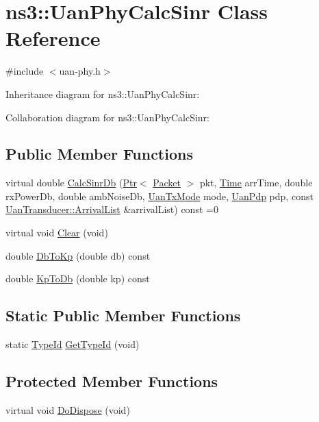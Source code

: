 \hypertarget{classns3_1_1UanPhyCalcSinr}{}\section{ns3\+:\+:Uan\+Phy\+Calc\+Sinr Class Reference}
\label{classns3_1_1UanPhyCalcSinr}


{\ttfamily \#include $<$uan-\/phy.\+h$>$}



Inheritance diagram for ns3\+:\+:Uan\+Phy\+Calc\+Sinr\+:


Collaboration diagram for ns3\+:\+:Uan\+Phy\+Calc\+Sinr\+:
\subsection*{Public Member Functions}
\begin{DoxyCompactItemize}
\item 
virtual double \hyperlink{classns3_1_1UanPhyCalcSinr_ad595f00cc07f863e9f5f957e2f772d56}{Calc\+Sinr\+Db} (\hyperlink{classns3_1_1Ptr}{Ptr}$<$ \hyperlink{classns3_1_1Packet}{Packet} $>$ pkt, \hyperlink{classns3_1_1Time}{Time} arr\+Time, double rx\+Power\+Db, double amb\+Noise\+Db, \hyperlink{classns3_1_1UanTxMode}{Uan\+Tx\+Mode} mode, \hyperlink{classns3_1_1UanPdp}{Uan\+Pdp} pdp, const \hyperlink{classns3_1_1UanTransducer_a95332a21e30506421a116d4b5c4dfd75}{Uan\+Transducer\+::\+Arrival\+List} \&arrival\+List) const =0
\item 
virtual void \hyperlink{classns3_1_1UanPhyCalcSinr_a261a25e32337a4508f4af8d7f3104c2f}{Clear} (void)
\item 
double \hyperlink{classns3_1_1UanPhyCalcSinr_a7af4e8735a93dabeef93d929fe166d27}{Db\+To\+Kp} (double db) const 
\item 
double \hyperlink{classns3_1_1UanPhyCalcSinr_a5f57a07d4f7e8e457a4c6fb946b9ec96}{Kp\+To\+Db} (double kp) const 
\end{DoxyCompactItemize}
\subsection*{Static Public Member Functions}
\begin{DoxyCompactItemize}
\item 
static \hyperlink{classns3_1_1TypeId}{Type\+Id} \hyperlink{classns3_1_1UanPhyCalcSinr_af5382707645cee01917d3846e87312f4}{Get\+Type\+Id} (void)
\end{DoxyCompactItemize}
\subsection*{Protected Member Functions}
\begin{DoxyCompactItemize}
\item 
virtual void \hyperlink{classns3_1_1UanPhyCalcSinr_a18d596347f3e7389c6cdd82993553412}{Do\+Dispose} (void)
\end{DoxyCompactItemize}
